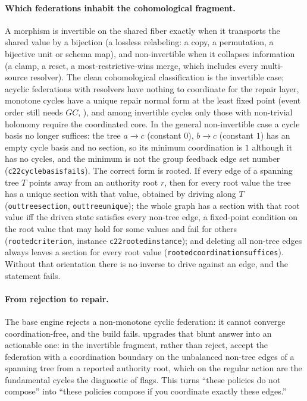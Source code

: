 \documentclass[11pt,a4paper]{article}
\theoremstyle{plain}
\theoremstyle{definition}
\theoremstyle{remark}
\renewcommand{\_}{\origunderscore\allowbreak}
\begin{document}
\paragraph{Which federations inhabit the cohomological fragment.} A morphism is invertible on the
shared fiber exactly when it transports the shared value by a bijection (a lossless relabeling: a
copy, a permutation, a bijective unit or schema map), and non-invertible when it collapses
information (a clamp, a reset, a most-restrictive-wins merge, which includes every multi-source
resolver). The clean cohomological classification is the invertible case; acyclic federations with
resolvers have nothing to coordinate for the repair layer, monotone cycles have a unique repair normal
form at the least fixed point (event order still needs $GC$, ), and among
invertible cycles only those with non-trivial holonomy require the coordinated core. In the general
non-invertible case a cycle basis no longer suffices: the tree $a \to c$ (constant $0$),
$b \to c$ (constant $1$) has an empty cycle basis and no section, so its minimum coordination is $1$
although it has no cycles, and the minimum is not the group feedback edge set number
(\texttt{c22\_cycle\_basis\_fails}). The correct form is rooted. If every edge of a spanning tree
$T$ points away from an authority root $r$, then for every root value the tree has a unique section
with that value, obtained by driving along $T$ (\texttt{out\_tree\_section},
\texttt{out\_tree\_unique}); the whole graph has a section with that root value iff the driven state
satisfies every non-tree edge, a fixed-point condition on the root value that may hold for some
values and fail for others (\texttt{rooted\_criterion}, instance \texttt{c22\_rooted\_instance}); and
deleting all non-tree edges always leaves a section for every root value
(\texttt{rooted\_coordination\_suffices}). Without that orientation there is no inverse to drive
against an edge, and the statement fails.

\paragraph{From rejection to repair.} The base engine rejects a non-monotone cyclic federation: it
cannot converge coordination-free, and the build fails.  upgrades that blunt
answer into an actionable one: in the invertible fragment, rather than reject, accept the federation
with a coordination boundary on the unbalanced non-tree edges of a spanning tree from a reported
authority root, which on the regular action are the fundamental cycles the diagnostic of
 flags. This turns ``these policies do not compose'' into ``these policies
compose if you coordinate exactly these edges.''
\end{document}
